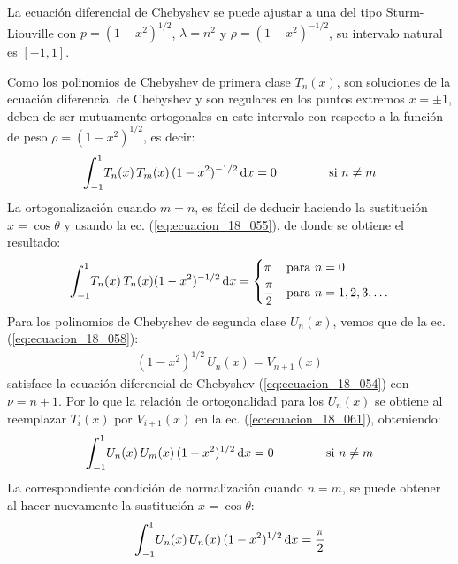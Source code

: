 \documentclass[12pt]{article}
\def\scaleint#1{\vcenter{\hbox{\scaleto[3ex]{\displaystyle\int}{#1}}}}
\def\bs{\mkern-12mu}
\numberwithin{equation}{section}
\begin{document}
La ecuación diferencial de Chebyshev se puede ajustar a una del tipo Sturm-Liouville con $p = (1 - x^{2})^{1/2}$, $\lambda = n^{2}$ y $\rho = (1 - x^{2})^{-1/2}$, su intervalo natural es $[-1, 1]$.
\par
Como los polinomios de Chebyshev de primera clase $T_{n}(x)$, son soluciones de la ecuación diferencial de Chebyshev y son regulares en los puntos extremos $x = \pm 1$, deben de ser mutuamente ortogonales en este intervalo con respecto a la función de peso $\rho = (1 - x^{2})^{1/2}$, es decir:
\begin{align}
\scaleint{6ex}_{\bs -1}^{1} T_{n}(x) \, T_{m}(x) \, (1 - x^{2})^{-1/2} \dd{x} = 0 \hspace{1.5cm} \mbox{si  } n \neq m
\label{ec:ecuacion_18_061}
\end{align}
La ortogonalización cuando $m = n$, es fácil de deducir haciendo la sustitución $x = \cos \theta$ y usando la ec. (\ref{eq:ecuacion_18_055}), de donde se obtiene el resultado:
\begin{align}
\scaleint{6ex}_{\bs -1}^{1} T_{n} (x) \, T_{n} (x) (1 - x^{2})^{-1/2} \dd{x} = \begin{cases}
\pi & \mbox{para  } n = 0 \\[0.5em]
\dfrac{\pi}{2} & \mbox{para  } n = 1, 2, 3, \ldots
\end{cases}
\label{eq:ecuacion_18_062}
\end{align}
Para los polinomios de Chebyshev de segunda clase $U_{n}(x)$, vemos que de la ec. (\ref{eq:ecuacion_18_058}):
\begin{align*}
(1 - x^{2})^{1/2} \, U_{n} (x) = V_{n+1} (x)
\end{align*}
satisface la ecuación diferencial de Chebyshev (\ref{eq:ecuacion_18_054}) con $\nu = n + 1$. Por lo que la relación de ortogonalidad para los $U_{n}(x)$ se obtiene al reemplazar $T_{i}(x)$ por $V_{i+1} (x)$ en la ec. (\ref{ec:ecuacion_18_061}), obteniendo:
\begin{align*}
\scaleint{6ex}_{\bs -1}^{1} U_{n}(x) \, U_{m}(x) \, (1 - x^{2})^{1/2} \dd{x} = 0 \hspace{1.5cm} \mbox{si  } n \neq m
\end{align*}
La correspondiente condición de normalización cuando $n = m$, se puede obtener al hacer nuevamente la sustitución $x  = \cos \theta$:
\begin{align*}
\scaleint{6ex}_{\bs -1}^{1} U_{n}(x) \, U_{n}(x) \, (1 - x^{2})^{1/2} \dd{x} = \dfrac{\pi}{2}
\end{align*}
\end{document}
